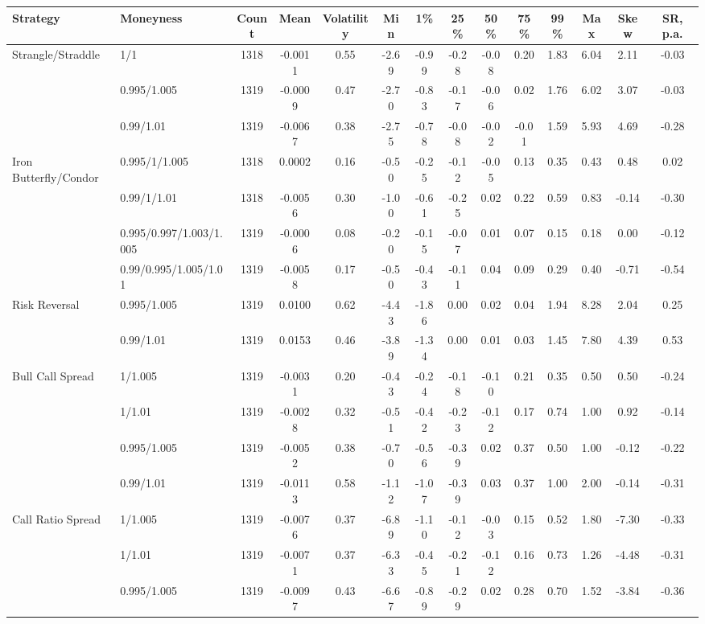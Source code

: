 \begin{tabular}{llcccccccccccc}
\toprule
Strategy & Moneyness & Count & Mean & Volatility & Min & 1\% & 25\% & 50\% & 75\% & 99\% & Max & Skew & SR, p.a. \\
\midrule
Strangle/Straddle & 1/1 & 1318 & -0.0011 & 0.55 & -2.69 & -0.99 & -0.28 & -0.08 & 0.20 & 1.83 & 6.04 & 2.11 & -0.03 \\
 & 0.995/1.005 & 1319 & -0.0009 & 0.47 & -2.70 & -0.83 & -0.17 & -0.06 & 0.02 & 1.76 & 6.02 & 3.07 & -0.03 \\
 & 0.99/1.01 & 1319 & -0.0067 & 0.38 & -2.75 & -0.78 & -0.08 & -0.02 & -0.01 & 1.59 & 5.93 & 4.69 & -0.28 \\
Iron Butterfly/Condor & 0.995/1/1.005 & 1318 & 0.0002 & 0.16 & -0.50 & -0.25 & -0.12 & -0.05 & 0.13 & 0.35 & 0.43 & 0.48 & 0.02 \\
 & 0.99/1/1.01 & 1318 & -0.0056 & 0.30 & -1.00 & -0.61 & -0.25 & 0.02 & 0.22 & 0.59 & 0.83 & -0.14 & -0.30 \\
 & 0.995/0.997/1.003/1.005 & 1319 & -0.0006 & 0.08 & -0.20 & -0.15 & -0.07 & 0.01 & 0.07 & 0.15 & 0.18 & 0.00 & -0.12 \\
 & 0.99/0.995/1.005/1.01 & 1319 & -0.0058 & 0.17 & -0.50 & -0.43 & -0.11 & 0.04 & 0.09 & 0.29 & 0.40 & -0.71 & -0.54 \\
Risk Reversal & 0.995/1.005 & 1319 & 0.0100 & 0.62 & -4.43 & -1.86 & 0.00 & 0.02 & 0.04 & 1.94 & 8.28 & 2.04 & 0.25 \\
 & 0.99/1.01 & 1319 & 0.0153 & 0.46 & -3.89 & -1.34 & 0.00 & 0.01 & 0.03 & 1.45 & 7.80 & 4.39 & 0.53 \\
Bull Call Spread & 1/1.005 & 1319 & -0.0031 & 0.20 & -0.43 & -0.24 & -0.18 & -0.10 & 0.21 & 0.35 & 0.50 & 0.50 & -0.24 \\
 & 1/1.01 & 1319 & -0.0028 & 0.32 & -0.51 & -0.42 & -0.23 & -0.12 & 0.17 & 0.74 & 1.00 & 0.92 & -0.14 \\
 & 0.995/1.005 & 1319 & -0.0052 & 0.38 & -0.70 & -0.56 & -0.39 & 0.02 & 0.37 & 0.50 & 1.00 & -0.12 & -0.22 \\
 & 0.99/1.01 & 1319 & -0.0113 & 0.58 & -1.12 & -1.07 & -0.39 & 0.03 & 0.37 & 1.00 & 2.00 & -0.14 & -0.31 \\
Call Ratio Spread & 1/1.005 & 1319 & -0.0076 & 0.37 & -6.89 & -1.10 & -0.12 & -0.03 & 0.15 & 0.52 & 1.80 & -7.30 & -0.33 \\
 & 1/1.01 & 1319 & -0.0071 & 0.37 & -6.33 & -0.45 & -0.21 & -0.12 & 0.16 & 0.73 & 1.26 & -4.48 & -0.31 \\
 & 0.995/1.005 & 1319 & -0.0097 & 0.43 & -6.67 & -0.89 & -0.29 & 0.02 & 0.28 & 0.70 & 1.52 & -3.84 & -0.36 \\

\end{tabular}
